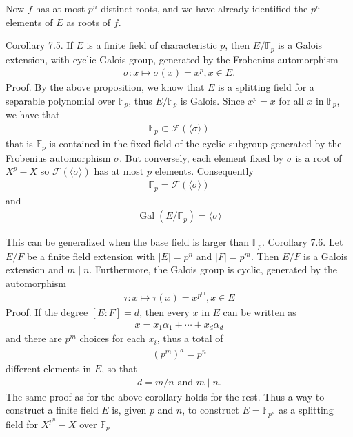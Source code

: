 \documentclass{article}
\begin{document}
Now $f$ has at most $p^{n}$ distinct roots, and we have already identified the $p^{n}$ elements of $E$ as roots of $f$.

Corollary 7.5. If $E$ is a finite field of characteristic $p$, then $E / \mathbb{F}_{p}$ is a Galois extension, with cyclic Galois group, generated by the Frobenius automorphism
\begin{align*}
\sigma: x \mapsto \sigma(x)=x^{p}, x \in E .
\end{align*}
Proof. By the above proposition, we know that $E$ is a splitting field for a separable polynomial over $\mathbb{F}_{p}$, thus $E / \mathbb{F}_{p}$ is Galois.
Since $x^{p}=x$ for all $x$ in $\mathbb{F}_{p}$, we have that
\begin{align*}
\mathbb{F}_{p} \subset \mathcal{F}(\langle\sigma\rangle)
\end{align*}
that is $\mathbb{F}_{p}$ is contained in the fixed field of the cyclic subgroup generated by the Frobenius automorphism $\sigma$. But conversely, each element fixed by $\sigma$ is a root of $X^{p}-X$ so $\mathcal{F}(\langle\sigma\rangle)$ has at most $p$ elements. Consequently
\begin{align*}
\mathbb{F}_{p}=\mathcal{F}(\langle\sigma\rangle)
\end{align*}
and
\begin{align*}
\operatorname{Gal}\left(E / \mathbb{F}_{p}\right)=\langle\sigma\rangle
\end{align*}

This can be generalized when the base field is larger than $\mathbb{F}_{p}$.
Corollary 7.6. Let $E / F$ be a finite field extension with $|E|=p^{n}$ and $|F|=p^{m}$. Then $E / F$ is a Galois extension and $m \mid n$. Furthermore, the Galois group is cyclic, generated by the automorphism
\begin{align*}
\tau: x \mapsto \tau(x)=x^{p^{m}}, x \in E
\end{align*}
Proof. If the degree $[E: F]=d$, then every $x$ in $E$ can be written as
\begin{align*}
x=x_{1} \alpha_{1}+\cdots+x_{d} \alpha_{d}
\end{align*}
and there are $p^{m}$ choices for each $x_{i}$, thus a total of
\begin{align*}
\left(p^{m}\right)^{d}=p^{n}
\end{align*}
different elements in $E$, so that
\begin{align*}
d=m / n \text { and } m \mid n .
\end{align*}
The same proof as for the above corollary holds for the rest.
Thus a way to construct a finite field $E$ is, given $p$ and $n$, to construct $E=\mathbb{F}_{p^{n}}$ as a splitting field for $X^{p^{n}}-X$ over $\mathbb{F}_{p}$
\end{document}
